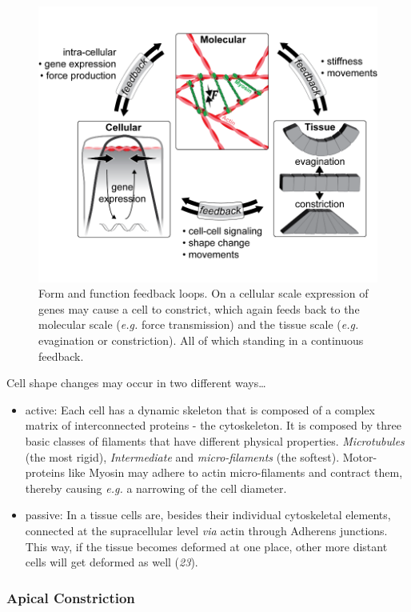 \documentclass[10pt, b5paper, singlespacinge, twoside]{reedthesis} %
\providecommand{\tightlist}{%
  \setlength{\itemsep}{0pt}\setlength{\parskip}{0pt}}
\theoremstyle{definition}
\theoremstyle{definition}
\theoremstyle{definition}
\theoremstyle{remark}
\begin{document}
\begin{figure}[H]

{\centering \includegraphics[width=0.85\linewidth]{figures/intro/feedback} 

}

\caption[Form and function feedback loops]{Form and function feedback loops. On a cellular scale expression of genes may cause a cell to constrict, which again feeds back to the molecular scale (\emph{e.g.} force transmission) and the tissue scale (\emph{e.g.} evagination or constriction). All of which standing in a continuous feedback.}\label{fig:feedb}
\end{figure}
Cell shape changes may occur in two different ways\ldots{}
\begin{itemize}
\tightlist
\item
  active: Each cell has a dynamic skeleton that is composed of a complex matrix of interconnected proteins - the cytoskeleton. It is composed by three basic classes of filaments that have different physical properties. \emph{Microtubules} (the most rigid), \emph{Intermediate} and \emph{micro-filaments} (the softest). Motor-proteins like Myosin may adhere to actin micro-filaments and contract them, thereby causing \emph{e.g.} a narrowing of the cell diameter.
\item
  passive: In a tissue cells are, besides their individual cytoskeletal elements, connected at the supracellular level \emph{via} actin through Adherens junctions. This way, if the tissue becomes deformed at one place, other more distant cells will get deformed as well (\emph{23}).
\end{itemize}
\hypertarget{apical-constriction}{%
\subsubsection{Apical Constriction}\label{apical-constriction}}
\end{document}
